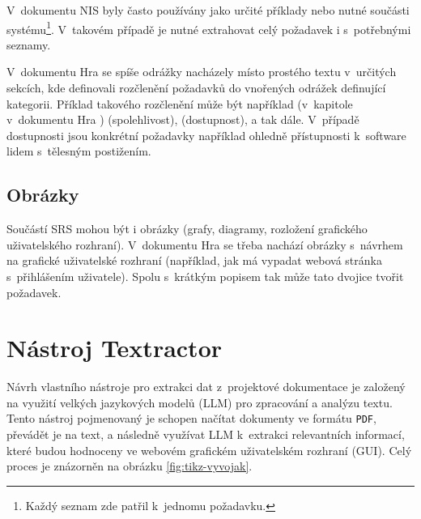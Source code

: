 \documentclass[czech, bc, kiv, he, iso690numb, pdf]{fasthesis}
\begin{document}
V~dokumentu NIS byly často používány jako určité příklady nebo nutné součásti systému\footnote{Každý seznam zde patřil k~jednomu požadavku.}. V~takovém případě je nutné extrahovat celý požadavek i s~potřebnými seznamy.

V~dokumentu Hra se spíše odrážky nacházely místo prostého textu v~určitých sekcích, kde definovali rozčlenění požadavků do vnořených odrážek definující kategorii. Příklad takového rozčlenění může být například (v~kapitole  v~dokumentu Hra \cite{doc-hra})  (spolehlivost),  (dostupnost), a tak dále. V~případě dostupnosti jsou konkrétní požadavky například ohledně přístupnosti k~software lidem s~tělesným postižením.

\section{Obrázky}
Součástí SRS mohou být i obrázky (grafy, diagramy, rozložení grafického uživatelského rozhraní). V~dokumentu Hra se třeba nachází obrázky s~návrhem na grafické uživatelské rozhraní (například, jak má vypadat webová stránka s~přihlášením uživatele). Spolu s~krátkým popisem tak může tato dvojice tvořit požadavek.

\chapter{Nástroj Textractor}
Návrh vlastního nástroje pro extrakci dat z~projektové dokumentace je založený na využití velkých jazykových modelů (LLM) pro zpracování a analýzu textu. Tento nástroj pojmenovaný  je schopen načítat dokumenty ve formátu \verb"PDF", převádět je na text, a následně využívat LLM k~extrakci relevantních informací, které budou hodnoceny ve webovém grafickém uživatelském rozhraní (GUI). Celý proces je znázorněn na obrázku \ref{fig:tikz-vyvojak}.
\end{document}
